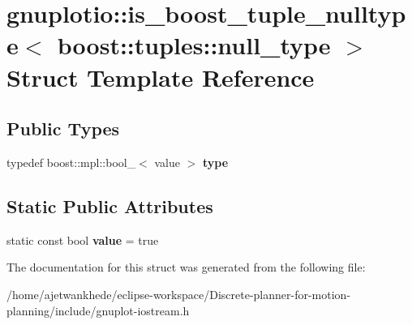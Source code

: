 \hypertarget{structgnuplotio_1_1is__boost__tuple__nulltype_3_01boost_1_1tuples_1_1null__type_01_4}{}\section{gnuplotio\+:\+:is\+\_\+boost\+\_\+tuple\+\_\+nulltype$<$ boost\+:\+:tuples\+:\+:null\+\_\+type $>$ Struct Template Reference}
\label{structgnuplotio_1_1is__boost__tuple__nulltype_3_01boost_1_1tuples_1_1null__type_01_4}
\subsection*{Public Types}
\begin{DoxyCompactItemize}
\item 
\mbox{\label{structgnuplotio_1_1is__boost__tuple__nulltype_3_01boost_1_1tuples_1_1null__type_01_4_aab5c47dbae2148f1e9ed4d89f25f21fd}} 
typedef boost\+::mpl\+::bool\+\_\+$<$ value $>$ {\bfseries type}
\end{DoxyCompactItemize}
\subsection*{Static Public Attributes}
\begin{DoxyCompactItemize}
\item 
\mbox{\label{structgnuplotio_1_1is__boost__tuple__nulltype_3_01boost_1_1tuples_1_1null__type_01_4_ae7fc5c63a7b01851c7ce12dbf634cfea}} 
static const bool {\bfseries value} = true
\end{DoxyCompactItemize}


The documentation for this struct was generated from the following file\+:\begin{DoxyCompactItemize}
\item 
/home/ajetwankhede/eclipse-\/workspace/\+Discrete-\/planner-\/for-\/motion-\/planning/include/gnuplot-\/iostream.\+h\end{DoxyCompactItemize}
